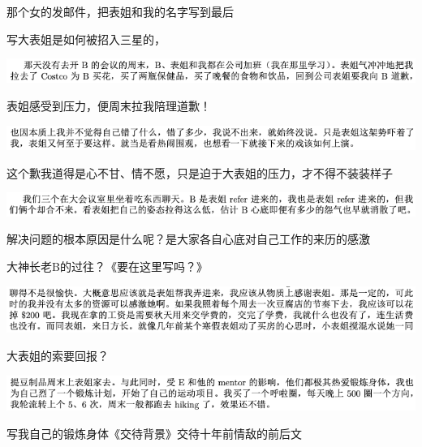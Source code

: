 \documentclass[9pt, b5paper]{article}
\begin{document}
那个女的发邮件，把表姐和我的名字写到最后

写大表姐是如何被招入三星的，

\begin{center}
\includegraphics[width=.9\linewidth]{./pic/backups_plans_20210507_092305.png}
\end{center}

表姐感受到压力，便周末拉我陪理道歉！

\begin{center}
\includegraphics[width=.9\linewidth]{./pic/backups_plans_20210507_092433.png}
\end{center}

这个歉我道得是心不甘、情不愿，只是迫于大表姐的压力，才不得不装装样子

\begin{center}
\includegraphics[width=.9\linewidth]{./pic/backups_plans_20210507_092526.png}
\end{center}

解决问题的根本原因是什么呢？是大家各自心底对自己工作的来历的感激

大神长老B的过往？《要在这里写吗？》

\begin{center}
\includegraphics[width=.9\linewidth]{./pic/backups_plans_20210507_092150.png}
\end{center}

大表姐的索要回报？


\begin{center}
\includegraphics[width=.9\linewidth]{./pic/backups_plans_20210507_092117.png}
\end{center}

写我自己的锻炼身体《交待背景》交待十年前情敌的前后文
\end{document}
